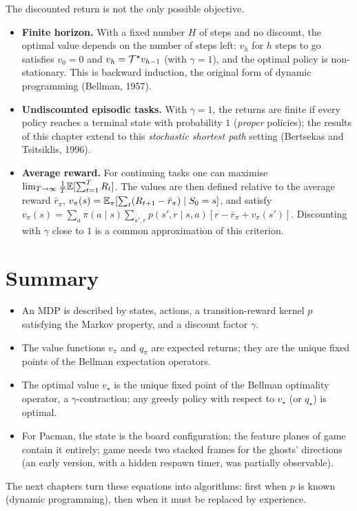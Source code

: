 The discounted return is not the only possible objective.
\begin{itemize}
  \item \textbf{Finite horizon.} With a fixed number $H$ of steps and no
    discount, the optimal value depends on the number of steps left: $v_h$
    for $h$ steps to go satisfies $v_0 = 0$ and $v_{h} = \mathcal{T}^\star v_{h-1}$
    (with $\gamma = 1$), and the optimal policy is non-stationary. This is
    backward induction, the original form of dynamic programming
    (Bellman, 1957).
  \item \textbf{Undiscounted episodic tasks.} With $\gamma = 1$, the
    returns are finite if every policy reaches a terminal state with
    probability $1$ (\emph{proper} policies); the results of this chapter
    extend to this \emph{stochastic shortest path} setting (Bertsekas and
    Tsitsiklis, 1996).
  \item \textbf{Average reward.} For continuing tasks one can maximise
    $\lim_{T \to \infty} \frac{1}{T} \mathbb{E}[\sum_{t=1}^T R_t]$. The values are
    then defined relative to the average reward $\bar r_\pi$, $v_\pi(s) =
    \mathbb{E}_\pi[\sum_t (R_{t+1} - \bar r_\pi) \mid S_0 = s]$, and satisfy
    $v_\pi(s) = \sum_a \pi(a \mid s) \sum_{s', r} p(s', r \mid s, a) [r -
    \bar r_\pi + v_\pi(s')]$. Discounting with $\gamma$ close to $1$ is a
    common approximation of this criterion.
\end{itemize}

\section{Summary}

\begin{itemize}[nosep]
  \item An MDP is described by states, actions, a transition-reward kernel
    $p$ satisfying the Markov property, and a discount factor $\gamma$.
  \item The value functions $v_\pi$ and $q_\pi$ are expected returns; they
    are the unique fixed points of the Bellman expectation operators.
  \item The optimal value $v_\star$ is the unique fixed point of the
    Bellman optimality operator, a $\gamma$-contraction; any greedy policy
    with respect to $v_\star$ (or $q_\star$) is optimal.
  \item For Pacman, the state is the board configuration; the feature
    planes of game  contain it entirely; game  needs two
    stacked frames for the ghosts' directions (an early version, with a
    hidden respawn timer, was partially observable).
\end{itemize}
The next chapters turn these equations into algorithms: first when $p$ is
known (dynamic programming), then when it must be replaced by experience.
